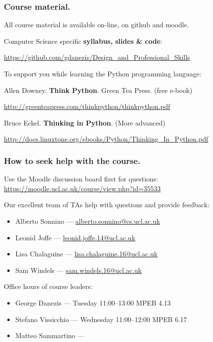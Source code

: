 \documentclass{beamer} %
\newcommand\emc[1]{\textcolor{brightblue}{\textbf{#1}}}
\begin{document}
\begin{frame}
\frametitle{Course material.} 

All course material is available on-line, on github and moodle.

\vspace{7mm}
Computer Science specific \emc{syllabus, slides \& code}: 

\url{https://github.com/gdanezis/Design_and_Professional_Skills}

\vspace{7mm}
To support you while learning the Python programming language:

\vspace{2mm}
Allen Downey. \emc{Think Python}. Green Tea Press. (free e-book)

{\small \url{http://greenteapress.com/thinkpython/thinkpython.pdf} }

\vspace{2mm}
Bruce Eckel. \emc{Thinking in Python}. (More advanced)

{\small \url{http://docs.linuxtone.org/ebooks/Python/Thinking_In_Python.pdf} }


\end{frame}

\begin{frame}
\frametitle{How to seek help with the course.} 

Use the Moodle discussion board first for questions: 
\url{https://moodle.ucl.ac.uk/course/view.php?id=35533}

\vspace{3mm}
Our excellent team of TAs help with questions and provide feedback:
\begin{itemize}
\item Alberto Sonnino --- \url{alberto.sonnino@cs.ucl.ac.uk}
\item Leonid Joffe --- \url{leonid.joffe.14@ucl.ac.uk}
\item Lisa Chalaguine --- \url{lisa.chalaguine.16@ucl.ac.uk}
\item Sam Windels --- \url{sam.windels.16@ucl.ac.uk}
\end{itemize}

\vspace{3mm}
Office hours of course leaders:
\begin{itemize}
\item George Danezis --- Tuesday 11:00--13:00 MPEB 4.13
\item Stefano Vissicchio --- Wednesday 11:00--12:00 MPEB 6.17
\item Matteo Sammartino --- 
\end{itemize}

\end{frame}
\end{document}
